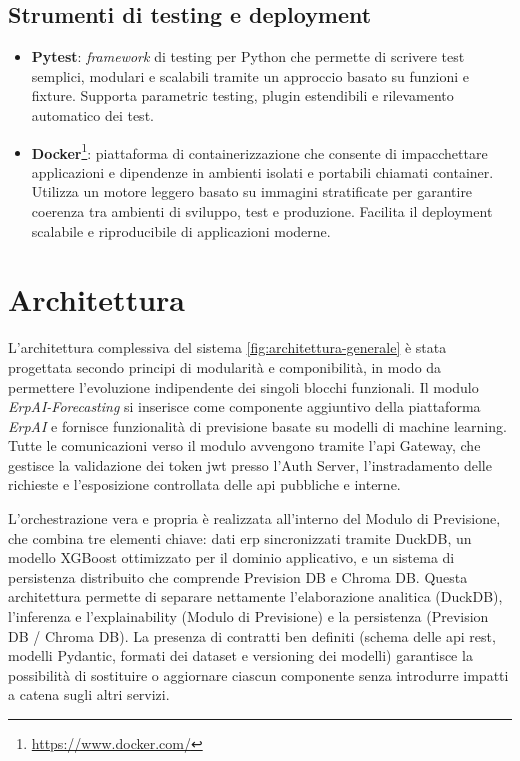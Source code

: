 \subsection{Strumenti di testing e deployment}
\begin{itemize}
    \item \textbf{Pytest}: \textit{framework} di testing per Python che permette di scrivere test semplici, modulari e scalabili tramite un approccio basato su funzioni e fixture. Supporta parametric testing, plugin estendibili e rilevamento automatico dei test.
    \item \textbf{Docker}\footnote{\url{https://www.docker.com/}}: piattaforma di containerizzazione che consente di impacchettare applicazioni e dipendenze in ambienti isolati e portabili chiamati container. Utilizza un motore leggero basato su immagini stratificate per garantire coerenza tra ambienti di sviluppo, test e produzione. Facilita il deployment scalabile e riproducibile di applicazioni moderne.
\end{itemize}

\section{Architettura}
\label{sec:architettura}

L’architettura complessiva del sistema \ref{fig:architettura-generale} è stata progettata secondo principi di modularità e componibilità, in modo da permettere l’evoluzione indipendente dei singoli blocchi funzionali. 
Il modulo \textit{ErpAI-Forecasting} si inserisce come componente aggiuntivo della piattaforma \textit{ErpAI} e fornisce funzionalità di previsione basate su modelli di machine learning. 
Tutte le comunicazioni verso il modulo avvengono tramite l’\gls{api} Gateway, che gestisce la validazione dei token \acrshort{jwt} presso l’Auth Server, l’instradamento delle richieste e l’esposizione controllata delle \acrshort{api} pubbliche e interne. 

L’orchestrazione vera e propria è realizzata all’interno del Modulo di Previsione, che combina tre elementi chiave: dati \gls{erp} sincronizzati tramite DuckDB, un modello XGBoost ottimizzato per il dominio applicativo, e un sistema di persistenza distribuito che comprende Prevision DB e Chroma DB. 
Questa architettura permette di separare nettamente l’elaborazione analitica (DuckDB), l’inferenza e l’explainability (Modulo di Previsione) e la persistenza (Prevision DB / Chroma DB).  
La presenza di contratti ben definiti (schema delle \acrshort{api} \acrshort{rest}, modelli Pydantic, formati dei dataset e versioning dei modelli) garantisce la possibilità di sostituire o aggiornare ciascun componente senza introdurre impatti a catena sugli altri servizi.


